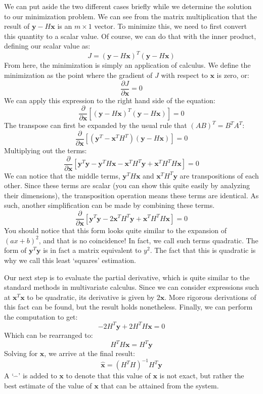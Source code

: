 We can put aside the two different cases briefly while we determine the solution to our minimization problem. We can see from the matrix multiplication that the result of $\bm{y}-H\bm{x}$ is an $m\times1$ vector. To minimize this, we need to first convert this quantity to a scalar value. Of course, we can do that with the inner product, defining our scalar value as:
\begin{equation}\label{eq:least squares start}
    J=(\bm{y}-H\bm{x})^T(\bm{y}-H\bm{x})
\end{equation}
From here, the minimization is simply an application of calculus. We define the minimization as the point where the gradient of $J$ with respect to $\bm{x}$ is zero, or:
$$\frac{\partial J}{\partial \bm{x}}=0$$
We can apply this expression to the right hand side of the equation:
$$\frac{\partial}{\partial \bm{x}}\left[(\bm{y}-H\bm{x})^T(\bm{y}-H\bm{x})\right]=0$$
The transpose can first be expanded by the usual rule that $(AB)^T=B^TA^T$:
$$\frac{\partial}{\partial \bm{x}}\left[(\bm{y}^T-\bm{x}^TH^T)(\bm{y}-H\bm{x})\right]=0$$
Multiplying out the terms:
$$\frac{\partial}{\partial \bm{x}}\left[\bm{y}^T\bm{y}-\bm{y}^TH\bm{x}-\bm{x}^TH^T\bm{y}+\bm{x}^TH^TH\bm{x}\right]=0$$
We can notice that the middle terms, $\bm{y}^TH\bm{x}$ and $\bm{x}^TH^T\bm{y}$ are transpositions of each other. Since these terms are scalar (you can show this quite easily by analyzing their dimensions), the transposition operation means these terms are identical. As such, another simplification can be made by combining these terms.
$$\frac{\partial}{\partial \bm{x}}\left[\bm{y}^T\bm{y}-2\bm{x}^TH^T\bm{y}+\bm{x}^TH^TH\bm{x}\right]=0$$
You should notice that this form looks quite similar to the expansion of $(ax+b)^2$, and that is no coincidence! In fact, we call such terms quadratic. The form of $\bm{y}^T\bm{y}$ is in fact a matrix equivalent to $y^2$. The fact that this is quadratic is why we call this least `squares' estimation.

Our next step is to evaluate the partial derivative, which is quite similar to the standard methods in multivariate calculus. Since we can consider expressions such at $\bm{x}^T\bm{x}$ to be quadratic, its derivative is given by $2\bm{x}$. More rigorous derivations of this fact can be found, but the result holds nonetheless. Finally, we can perform the computation to get:
$$-2H^T\bm{y}+2H^TH\bm{x}=0$$
Which can be rearranged to:
$$H^TH\bm{x}=H^T\bm{y}$$
Solving for $\bm{x}$, we arrive at the final result:
$$\bm{\hat{x}}=(H^TH)^{-1}H^T\bm{y}$$
A `$\hat{\ \ \ }$' is added to $\bm{x}$ to denote that this value of $\bm{x}$ is not exact, but rather the best estimate of the value of $\bm{x}$ that can be attained from the system. 

